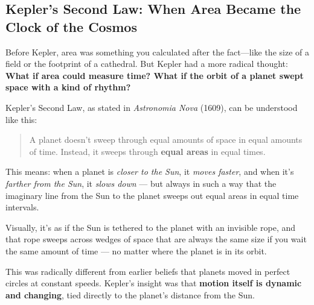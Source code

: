 \subsection{Kepler’s Second Law: When Area Became the Clock of the Cosmos}

Before Kepler, area was something you calculated after the fact—like the size of a field or the footprint of a cathedral. But Kepler had a more radical thought: \textbf{What if area could measure time? What if the orbit of a planet swept space with a kind of rhythm?}

Kepler’s Second Law, as stated in \textit{Astronomia Nova} (1609), can be understood like this:

\begin{quote}
A planet doesn’t sweep through equal amounts of space in equal amounts of time. Instead, it sweeps through \textbf{equal areas} in equal times.
\end{quote}

This means: when a planet is \textit{closer to the Sun}, it \textit{moves faster}, and when it’s \textit{farther from the Sun}, it \textit{slows down} — but always in such a way that the imaginary line from the Sun to the planet sweeps out equal areas in equal time intervals.

Visually, it’s as if the Sun is tethered to the planet with an invisible rope, and that rope sweeps across wedges of space that are always the same size if you wait the same amount of time — no matter where the planet is in its orbit.

This was radically different from earlier beliefs that planets moved in perfect circles at constant speeds. Kepler’s insight was that \textbf{motion itself is dynamic and changing}, tied directly to the planet’s distance from the Sun.

